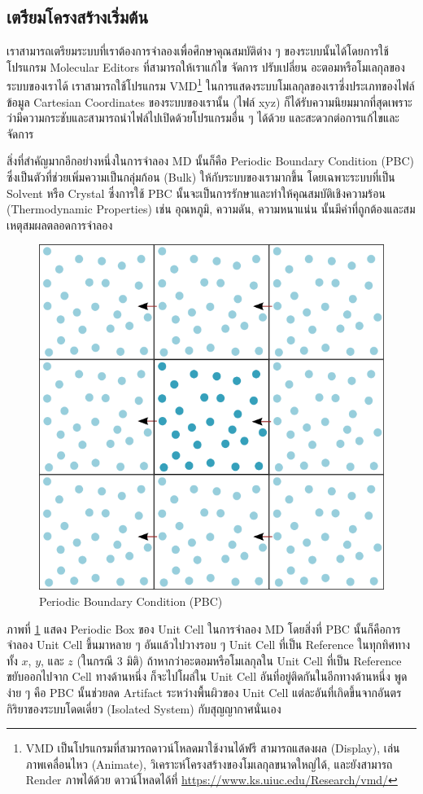 \subsection{เตรียมโครงสร้างเริ่มต้น}

เราสามารถเตรียมระบบที่เราต้องการจำลองเพื่อศึกษาคุณสมบัติต่าง ๆ ของระบบนั้นได้โดยการใช้โปรแกรม Molecular Editors ที่สามารถให้เราแก้ไข
จัดการ ปรับเปลี่ยน อะตอมหรือโมเลกุลของระบบของเราได้ เราสามารถใช้โปรแกรม VMD\footnote{VMD เป็นโปรแกรมที่สามารถดาวน์โหลดมาใช้งานได้ฟรี 
สามารถแสดงผล (Display), เล่นภาพเคลื่อนไหว (Animate), วิเคราะห์โครงสร้างของโมเลกุลขนาดใหญ่ได้, และยังสามารถ Render ภาพได้ด้วย 
ดาวน์โหลดได้ที่ \url{https://www.ks.uiuc.edu/Research/vmd/}} ในการแสดงระบบโมเลกุลของเราซึ่งประเภทของไฟล์ข้อมูล Cartesian
Coordinates ของระบบของเรานั้น (ไฟล์ xyz) ก็ได้รับความนิยมมากที่สุดเพราะว่ามีความกระชับและสามารถนำไฟล์ไปเปิดด้วยโปรแกรมอื่น ๆ ได้ด้วย
และสะดวกต่อการแก้ไขและจัดการ

สิ่งที่สำคัญมากอีกอย่างหนึ่งในการจำลอง MD นั้นก็คือ Periodic Boundary Condition (PBC) ซึ่งเป็นตัวที่ช่วยเพิ่มความเป็นกลุ่มก้อน (Bulk)
ให้กับระบบของเรามากขึ้น โดยเฉพาะระบบที่เป็น Solvent หรือ Crystal ซึ่งการใช้ PBC นั้นจะเป็นการรักษาและทำให้คุณสมบัติเชิงความร้อน
(Thermodynamic Properties) เช่น อุณหภูมิ, ความดัน, ความหนาแน่น นั้นมีค่าที่ถูกต้องและสมเหตุสมผลตลอดการจำลอง

\begin{figure}[htbp]
  \centering
  \includegraphics[width=0.5\linewidth]{fig/pbc.png}
  \caption{Periodic Boundary Condition (PBC)}
  \label{fig:pbc}
\end{figure}

ภาพที่ \ref{fig:pbc} แสดง Periodic Box ของ Unit Cell ในการจำลอง MD โดยสิ่งที่ PBC นั้นก็คือการจำลอง Unit Cell ขึ้นมาหลาย ๆ
อันแล้วไปวางรอบ ๆ Unit Cell ที่เป็น Reference ในทุกทิศทางทั้ง $x$, $y$, และ $z$ (ในกรณี 3 มิติ) ถ้าหากว่าอะตอมหรือโมเลกุลใน 
Unit Cell ที่เป็น Reference ขยับออกไปจาก Cell ทางด้านหนึ่ง ก็จะไปโผล่ใน Unit Cell อันที่อยู่ติดกันในอีกทางด้านหนึ่ง พูดง่าย ๆ คือ PBC 
นั้นช่วยลด Artifact ระหว่างพื้นผิวของ Unit Cell แต่ละอันที่เกิดขึ้นจากอันตรกิริยาของระบบโดดเดี่ยว (Isolated System) กับสุญญากาศนั่นเอง

